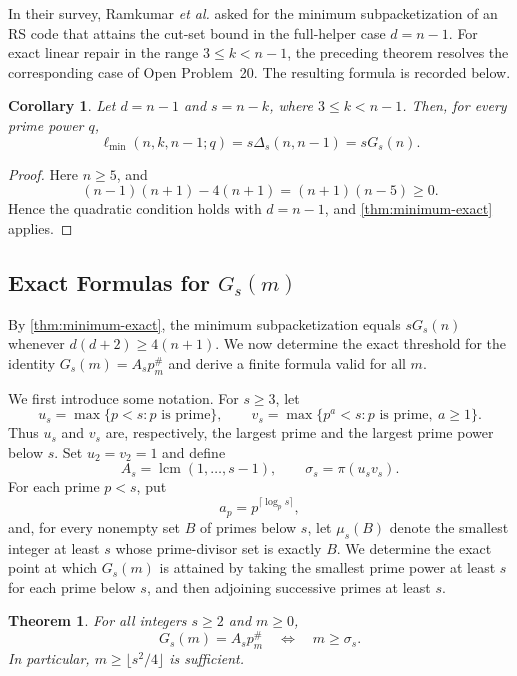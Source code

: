 \documentclass[11pt,onecolumn]{IEEEtran}
\newtheorem{theorem}{Theorem}
\newtheorem{corollary}{Corollary}
\newcommand{\lcmop}{\operatorname{lcm}}
\newcommand{\ellmin}{\ell_{\min}}
\newcommand{\primorial}[1]{p_{#1}^{\#}}
\begin{document}
In their survey, Ramkumar \emph{et al.}
\cite[Open Problem~20]{RamkumarEtAl2022} asked for the minimum
subpacketization of an RS code that attains the cut-set bound in the
full-helper case $d=n-1$. For exact linear repair in the range
$3\le k<n-1$, the preceding theorem resolves the corresponding case
of Open Problem~20. The resulting formula is recorded below.

\begin{corollary}
\label{cor:full-helper-exact}
Let $d=n-1$ and $s=n-k$, where $3\le k<n-1$.  Then, for every prime
power $q$,
\[
 \ellmin(n,k,n-1;q)
 =s\Delta_s(n,n-1)
 =sG_s(n).
\]
\end{corollary}

\begin{proof}
Here $n\ge5$, and
\[
 (n-1)(n+1)-4(n+1)=(n+1)(n-5)\ge0.
\]
Hence the quadratic condition holds with $d=n-1$, and
\cref{thm:minimum-exact} applies.
\end{proof}
\subsection{Exact Formulas for \texorpdfstring{$G_s(m)$}{G\_s(m)}}
\label{sec:Gs}
By \cref{thm:minimum-exact}, the minimum subpacketization
equals $sG_s(n)$ whenever $d(d+2)\geq 4(n+1)$.
We now determine the exact threshold for the identity
$G_s(m)=A_s\primorial{m}$ and derive a finite formula
valid for all $m$.

We first introduce some notation.  For $s\ge3$, let
\[
 u_s=\max\{p<s:p\text{ is prime}\},\qquad
 v_s=\max\{p^a<s:p\text{ is prime},\ a\ge1\}.
\]
Thus $u_s$ and $v_s$ are, respectively, the largest prime and the
largest prime power below $s$.  Set $u_2=v_2=1$ and define
\[
 A_s=\lcmop(1,\ldots,s-1),\qquad
 \sigma_s=\pi(u_sv_s).
\]
For each prime $p<s$, put
\[
a_p=p^{\lceil\log_p s\rceil},
\]
and, for every nonempty set $B$ of primes below $s$, let
$\mu_s(B)$ denote the smallest integer at least $s$ whose
prime-divisor set is exactly $B$.
We determine the exact point at which $G_s(m)$ is attained by taking
the smallest prime power at least $s$ for each prime below $s$, and
then adjoining successive primes at least $s$.

\begin{theorem}
\label{thm:G-stabilization}
For all integers $s\ge2$ and $m\ge0$,
\[
 G_s(m)=A_s\primorial{m}
 \quad\Longleftrightarrow\quad
 m\ge\sigma_s.
\]
In particular, $m\ge\lfloor s^2/4\rfloor$ is sufficient.
\end{theorem}
\end{document}
